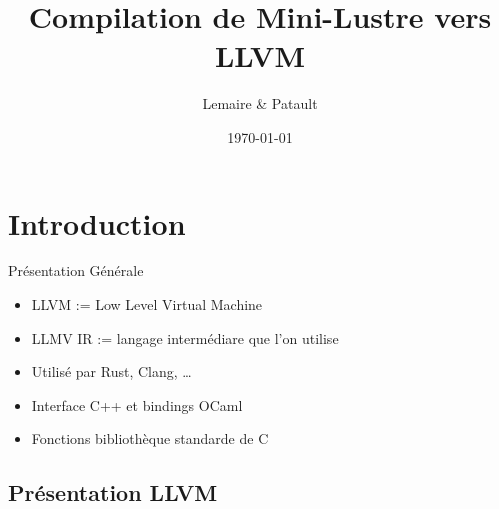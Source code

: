 \documentclass{beamer} %
\title[Mini-Lustre $\mapsto$ LLVM]{Compilation de Mini-Lustre vers LLVM}
\institute[UPSaclay]{Université Paris-Saclay}
\author{Lemaire \& Patault}
\date{\today}
\begin{document}

\begin{frame}
    \titlepage
\end{frame}

\section{Introduction}

\begin{frame}
    \tableofcontents[currentsection]
\end{frame}

\begin{frame}[fragile]{Présentation Générale}
            \vfill
    \begin{itemize}
        \item LLVM := Low Level Virtual Machine

        \vfill\item LLMV IR := langage intermédiare que l'on utilise

        \vfill\item Utilisé par Rust, Clang, \ldots

        \vfill\item Interface C++ et bindings OCaml

        \vfill\item Fonctions bibliothèque standarde de C
    \end{itemize}
            \vfill
\end{frame}

\subsection{Présentation LLVM}
\end{document}
